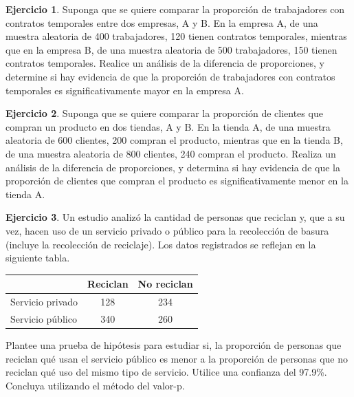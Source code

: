 \documentclass[
  11pt,
]{book}
\theoremstyle{definition}
\theoremstyle{definition}
\theoremstyle{definition}
\newtheorem{exercise}{Ejercicio}[chapter]
\theoremstyle{definition}
\theoremstyle{remark}
\begin{document}
\begin{exercise}
Suponga que se quiere comparar la proporción de trabajadores con contratos temporales entre dos empresas, A y B. En la empresa A, de una muestra aleatoria de 400 trabajadores, 120 tienen contratos temporales, mientras que en la empresa B, de una muestra aleatoria de 500 trabajadores, 150 tienen contratos temporales. Realice un análisis de la diferencia de proporciones, y determine si hay evidencia de que la proporción de trabajadores con contratos temporales es significativamente mayor en la empresa A.
\end{exercise}

\begin{exercise}
Suponga que se quiere comparar la proporción de clientes que compran un producto en dos tiendas, A y B. En la tienda A, de una muestra aleatoria de 600 clientes, 200 compran el producto, mientras que en la tienda B, de una muestra aleatoria de 800 clientes, 240 compran el producto. Realiza un análisis de la diferencia de proporciones, y determina si hay evidencia de que la proporción de clientes que compran el producto es significativamente menor en la tienda A.
\end{exercise}

\begin{exercise}
Un estudio analizó la cantidad de personas que reciclan y, que a su vez, hacen uso de un servicio privado o público para la recolección de basura (incluye la recolección de reciclaje). Los datos registrados se reflejan en la siguiente tabla.

\begin{table}[H]
\centering
\begin{tabular}[t]{lcc}
\toprule
  & Reciclan & No reciclan\\
\midrule
Servicio privado & 128 & 234\\
Servicio público & 340 & 260\\
\bottomrule
\end{tabular}
\end{table}

Plantee una prueba de hipótesis para estudiar si, la proporción de personas que reciclan qué usan el servicio público es menor a la proporción de personas que no reciclan qué uso del mismo tipo de servicio. Utilice una confianza del 97.9\%. Concluya utilizando el método del valor-p.~
\end{exercise}
\end{document}
